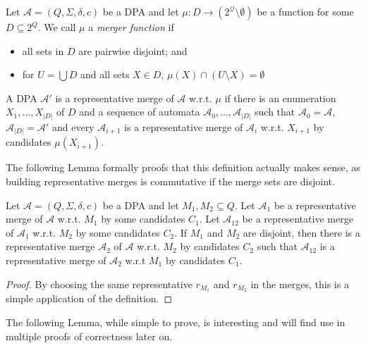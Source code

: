 \begin{defn}
	Let $\mathcal{A} = (Q, \Sigma, \delta, c)$ be a DPA and let $\mu : D \rightarrow (2^\mathcal{Q} \setminus \emptyset)$ be a function for some $D \subseteq 2^Q$. We call $\mu$ a \emph{merger function} if 
	\begin{itemize}
		\item all sets in $D$ are pairwise disjoint; and
		\item for $U = \bigcup D$ and all sets $X \in D$, $\mu(X) \cap (U \setminus X) = \emptyset$
	\end{itemize}
	
	A DPA $\mathcal{A}'$ is a representative merge of $\mathcal{A}$ w.r.t. $\mu$ if there is an enumeration $X_1, \dots, X_{|D|}$ of $D$ and a sequence of automata $\mathcal{A}_0, \dots, \mathcal{A}_{|D|}$ such that $\mathcal{A}_0 = \mathcal{A}$, $\mathcal{A}_{|D|} = \mathcal{A}'$ and every $\mathcal{A}_{i+1}$ is a representative merge of $\mathcal{A}_i$ w.r.t. $X_{i+1}$ by candidates $\mu(X_{i+1})$.
\end{defn}

\vspace{5pt}

The following Lemma formally proofs that this definition actually makes sense, as building representative merges is commutative if the merge sets are disjoint.

\begin{lem}
	Let $\mathcal{A} = (Q, \Sigma, \delta, c)$ be a DPA and let $M_1, M_2 \subseteq Q$. Let $\mathcal{A}_1$ be a representative merge of $\mathcal{A}$ w.r.t. $M_1$ by some candidates $C_1$. Let $\mathcal{A}_{12}$ be a representative merge of $\mathcal{A}_1$ w.r.t. $M_2$ by some candidates $C_2$. If $M_1$ and $M_2$ are disjoint, then there is a representative merge $\mathcal{A}_2$ of $\mathcal{A}$ w.r.t. $M_2$ by candidates $C_2$ such that $\mathcal{A}_{12}$ is a representative merge of $\mathcal{A}_2$ w.r.t $M_1$ by candidates $C_1$.
\end{lem}

\begin{proof}
	By choosing the same representative $r_{M_1}$ and $r_{M_2}$ in the merges, this is a simple application of the definition.
\end{proof}


\vspace{10pt}

The following Lemma, while simple to prove, is interesting and will find use in multiple proofs of correctness later on.

